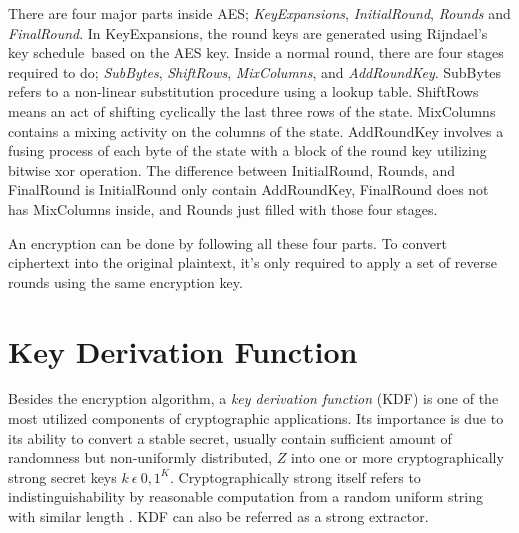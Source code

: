 There are four major parts inside AES; \textit{KeyExpansions}, \textit{InitialRound}, \textit{Rounds} and \textit{FinalRound}. In KeyExpansions, the round keys are generated using Rijndael's key schedule based on the AES key.
Inside a normal round, there are four stages required to do; \textit{SubBytes}, \textit{ShiftRows}, \textit{MixColumns}, and \textit{AddRoundKey}.
SubBytes refers to a non-linear substitution procedure using a lookup table. ShiftRows means an act of shifting cyclically the last three rows of the state. MixColumns contains a mixing activity on the columns of the state.
AddRoundKey involves a fusing process of each byte of the state with a block of the round key utilizing bitwise xor operation. The difference between InitialRound, Rounds, and FinalRound is InitialRound only contain AddRoundKey, FinalRound does not has MixColumns inside, and Rounds just filled with those four stages.

An encryption can be done by following all these four parts. To convert ciphertext into the original plaintext, it's only required to apply a set of reverse rounds using the same encryption key.

\section{Key Derivation Function}
Besides the encryption algorithm, a \textit{key derivation function} (KDF) is one of the most utilized components of cryptographic applications. Its importance is due to its ability to convert a stable secret, usually contain sufficient amount of randomness but non-uniformly distributed,  $Z$ into one or more cryptographically strong secret keys $k\ \epsilon\ {0,1}^K$.
Cryptographically strong itself refers to indistinguishability by reasonable computation from a random uniform string with similar length \cite{key_derivation}.
KDF can also be referred as a strong extractor.

